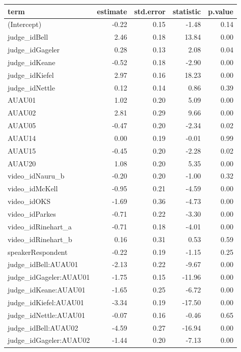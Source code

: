 \documentclass{monashthesis}
\begin{document}
\begin{tabular}{l|r|r|r|r}
\hline
term & estimate & std.error & statistic & p.value\\
\hline
(Intercept) & -0.22 & 0.15 & -1.48 & 0.14\\
\hline
judge\_idBell & 2.46 & 0.18 & 13.84 & 0.00\\
\hline
judge\_idGageler & 0.28 & 0.13 & 2.08 & 0.04\\
\hline
judge\_idKeane & -0.52 & 0.18 & -2.90 & 0.00\\
\hline
judge\_idKiefel & 2.97 & 0.16 & 18.23 & 0.00\\
\hline
judge\_idNettle & 0.12 & 0.14 & 0.86 & 0.39\\
\hline
AUAU01 & 1.02 & 0.20 & 5.09 & 0.00\\
\hline
AUAU02 & 2.81 & 0.29 & 9.66 & 0.00\\
\hline
AUAU05 & -0.47 & 0.20 & -2.34 & 0.02\\
\hline
AUAU14 & 0.00 & 0.19 & -0.01 & 0.99\\
\hline
AUAU15 & -0.45 & 0.20 & -2.28 & 0.02\\
\hline
AUAU20 & 1.08 & 0.20 & 5.35 & 0.00\\
\hline
video\_idNauru\_b & -0.20 & 0.20 & -1.00 & 0.32\\
\hline
video\_idMcKell & -0.95 & 0.21 & -4.59 & 0.00\\
\hline
video\_idOKS & -1.69 & 0.36 & -4.73 & 0.00\\
\hline
video\_idParkes & -0.71 & 0.22 & -3.30 & 0.00\\
\hline
video\_idRinehart\_a & -0.71 & 0.18 & -4.01 & 0.00\\
\hline
video\_idRinehart\_b & 0.16 & 0.31 & 0.53 & 0.59\\
\hline
speakerRespondent & -0.22 & 0.19 & -1.15 & 0.25\\
\hline
judge\_idBell:AUAU01 & -2.13 & 0.22 & -9.67 & 0.00\\
\hline
judge\_idGageler:AUAU01 & -1.75 & 0.15 & -11.96 & 0.00\\
\hline
judge\_idKeane:AUAU01 & -1.65 & 0.25 & -6.72 & 0.00\\
\hline
judge\_idKiefel:AUAU01 & -3.34 & 0.19 & -17.50 & 0.00\\
\hline
judge\_idNettle:AUAU01 & -0.07 & 0.16 & -0.46 & 0.65\\
\hline
judge\_idBell:AUAU02 & -4.59 & 0.27 & -16.94 & 0.00\\
\hline
judge\_idGageler:AUAU02 & -1.44 & 0.20 & -7.13 & 0.00\\

\end{tabular}
\end{document}
